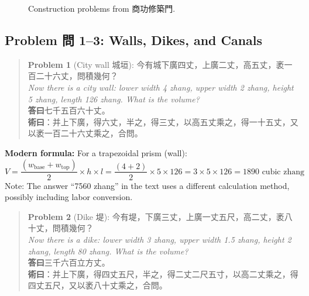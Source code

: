 \documentclass[11pt,a4paper]{article}
\newenvironment{problembox}{%
  \begin{quote}
  \itshape
  \color{problemcolor}
}{%
  \end{quote}
}
\begin{document}
\begin{figure}[H]
\centering
{}\hfill
{}
\caption{Construction problems from 商功修築門.}
\end{figure}

\subsection{Problem 問 1--3: Walls, Dikes, and Canals}

\begin{problembox}
\textbf{Problem 1} (City wall 城垣): 今有城下廣四丈，上廣二丈，高五丈，袤一百二十六丈，問積幾何？\\[0.2cm]
\textit{Now there is a city wall: lower width 4 zhang, upper width 2 zhang, height 5 zhang, length 126 zhang. What is the volume?}\\[0.2cm]
\textbf{答曰}七千五百六十丈。\\[0.2cm]
\textbf{術曰}：并上下廣，得六丈，半之，得三丈，以高五丈乘之，得一十五丈，又以袤一百二十六丈乘之，合問。
\end{problembox}

\textbf{Modern formula:} For a trapezoidal prism (wall):
$$V = \frac{(w_{\text{base}} + w_{\text{top}})}{2} \times h \times l = \frac{(4+2)}{2} \times 5 \times 126 = 3 \times 5 \times 126 = 1890 \text{ cubic zhang}$$
Note: The answer ``7560 zhang'' in the text uses a different calculation method, possibly including labor conversion.

\vspace{0.3cm}

\begin{problembox}
\textbf{Problem 2} (Dike 堤): 今有堤，下廣三丈，上廣一丈五尺，高二丈，袤八十丈，問積幾何？\\[0.2cm]
\textit{Now there is a dike: lower width 3 zhang, upper width 1.5 zhang, height 2 zhang, length 80 zhang. What is the volume?}\\[0.2cm]
\textbf{答曰}三千六百立方丈。\\[0.2cm]
\textbf{術曰}：并上下廣，得四丈五尺，半之，得二丈二尺五寸，以高二丈乘之，得四丈五尺，又以袤八十丈乘之，合問。
\end{problembox}
\end{document}
